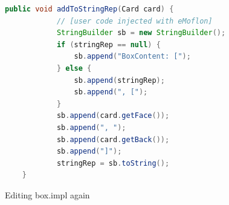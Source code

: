 \newpage

\vspace*{3cm}

\begin{figure}[h!]
        \centering
        \begin{lstlisting}[language=Java, keywordstyle={\bfseries\color{purple}}, backgroundcolor=\color{white}]
		public void addToStringRep(Card card) {
			// [user code injected with eMoflon]
			StringBuilder sb = new StringBuilder();
			if (stringRep == null) {
				sb.append("BoxContent: [");
			} else {
				sb.append(stringRep);
				sb.append(", [");
			}
			sb.append(card.getFace());
			sb.append(", ");
			sb.append(card.getBack());
			sb.append("]");
			stringRep = sb.toString();
	}
        \end{lstlisting}
        \caption{Editing box.impl again}
        \label{code:addToStringRep_inject_file}
    \end{figure}
    \FloatBarrier





